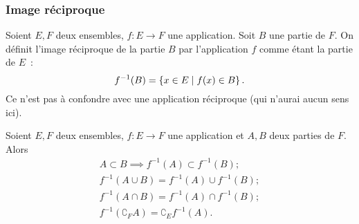 \subsubsection{Image réciproque} 
\label{chap3-subsubsec:imagereciproque}
\begin{defdef}
  Soient $E,F$ deux ensembles, $f:E \longrightarrow F$ une application. Soit $B$ une partie de $F$. On définit l'image réciproque de la partie $B$ par l'application $f$ comme étant la partie de $E$~:
  \begin{equation}
    f^{-1}(B)=\left\{x \in E\mathrel{}\middle|\mathrel{}f(x) \in B\right\}.
  \end{equation}
  Ce n'est pas à confondre avec une application réciproque (qui n'aurai aucun sens ici).
\end{defdef}
%
\begin{prop}
  Soient $E,F$ deux ensembles, $f:E \longrightarrow F$ une application et $A,B$ deux parties de $F$. Alors
  \begin{gather}
    A \subset B \implies f^{-1}(A) \subset f^{-1}(B);\\
    f^{-1}(A \cup B) = f^{-1}(A) \cup f^{-1}(B);\\
    f^{-1}(A \cap B) = f^{-1}(A) \cap f^{-1}(B);\\
    f^{-1}(\complement_F A) = \complement_E f^{-1}(A).
  \end{gather}
\end{prop}
